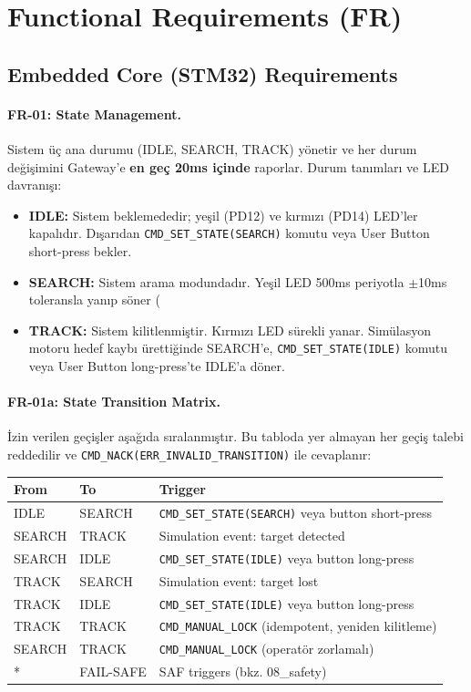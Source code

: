 \section{Functional Requirements (FR)}

\subsection{Embedded Core (STM32) Requirements}

\paragraph{FR-01: State Management.}
Sistem üç ana durumu (IDLE, SEARCH, TRACK) yönetir ve her durum değişimini Gateway'e \textbf{en geç 20ms içinde} raporlar. Durum tanımları ve LED davranışı:
\begin{itemize}
    \item \textbf{IDLE:} Sistem beklemededir; yeşil (PD12) ve kırmızı (PD14) LED'ler kapalıdır. Dışarıdan \texttt{CMD\_SET\_STATE(SEARCH)} komutu veya User Button short-press bekler.
    \item \textbf{SEARCH:} Sistem arama modundadır. Yeşil LED 500ms periyotla $\pm$10ms toleransla yanıp söner (%
    \item \textbf{TRACK:} Sistem kilitlenmiştir. Kırmızı LED sürekli yanar. Simülasyon motoru hedef kaybı ürettiğinde SEARCH'e, \texttt{CMD\_SET\_STATE(IDLE)} komutu veya User Button long-press'te IDLE'a döner.
\end{itemize}

\paragraph{FR-01a: State Transition Matrix.}
İzin verilen geçişler aşağıda sıralanmıştır. Bu tabloda yer almayan her geçiş talebi reddedilir ve \texttt{CMD\_NACK(ERR\_INVALID\_TRANSITION)} ile cevaplanır:

\begin{center}
\begin{tabular}{|l|l|l|}
\hline
\textbf{From} & \textbf{To} & \textbf{Trigger} \\
\hline
IDLE   & SEARCH & \texttt{CMD\_SET\_STATE(SEARCH)} veya button short-press \\
SEARCH & TRACK  & Simulation event: target detected \\
SEARCH & IDLE   & \texttt{CMD\_SET\_STATE(IDLE)} veya button long-press \\
TRACK  & SEARCH & Simulation event: target lost \\
TRACK  & IDLE   & \texttt{CMD\_SET\_STATE(IDLE)} veya button long-press \\
TRACK  & TRACK  & \texttt{CMD\_MANUAL\_LOCK} (idempotent, yeniden kilitleme) \\
SEARCH & TRACK  & \texttt{CMD\_MANUAL\_LOCK} (operatör zorlamalı) \\
*      & FAIL-SAFE & SAF triggers (bkz. 08\_safety) \\
\hline
\end{tabular}
\end{center}

